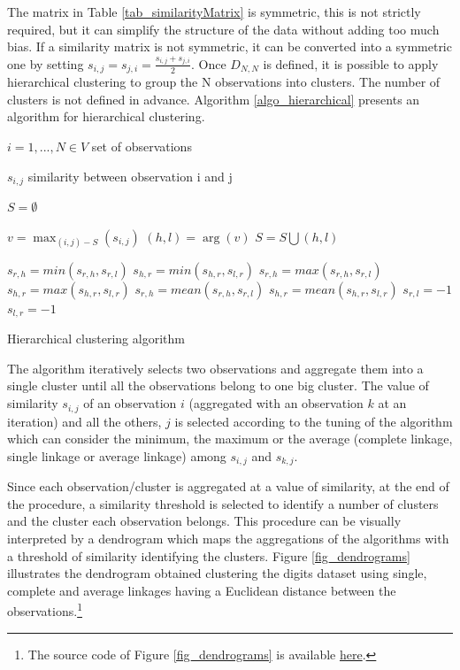 The matrix in Table \ref{tab_similarityMatrix} is symmetric, this is not strictly required, but it can simplify the structure of the data without adding too much bias. If a similarity matrix is not symmetric, it can be converted into a symmetric one by setting $s_{i,j}=s_{j,i}=\frac{s_{i,j}+s_{j,i}}{2}$. Once $D_{N,N}$ is defined, it is possible to apply hierarchical clustering to group the N observations into clusters. The number of clusters is not defined in advance. Algorithm \ref{algo_hierarchical} presents an algorithm for hierarchical clustering.

\begin{algorithm}[H]
\DontPrintSemicolon
\SetAlgoLined
    
    $i=1,...,N \in V$ set of observations \;
    
    $s_{i,j}$ similarity between observation i and j \;
    
    $S= \emptyset $ \;
    {
    $v =\max_{(i,j)-S}{(s_{i,j})}$ \;
    $(h,l)=\arg(v)$\;
    $S= S \bigcup (h,l)$ \;
    {
     {
    $s_{r,h}=min(s_{r,h},s_{r,l})$\;
    $s_{h,r}=min(s_{h,r},s_{l,r})$\;
    }
     {
    $s_{r,h}=max(s_{r,h},s_{r,l})$\;
    $s_{h,r}=max(s_{h,r},s_{l,r})$\;
    }
     {
    $s_{r,h}=mean(s_{r,h},s_{r,l})$\;
    $s_{h,r}=mean(s_{h,r},s_{l,r})$\;
    }
    $s_{r,l}=-1$\;
    $s_{l,r}=-1$\;
    
    }
    }
\caption{Hierarchical clustering algorithm}
\label{algo_hierarchical}        
\end{algorithm}

The algorithm iteratively selects two observations and aggregate them into a single cluster until all the observations belong to one big cluster. The value of similarity $s_{i,j}$ of an observation $i$ (aggregated with an observation $k$ at an iteration) and all the others, $j$ is selected according to the tuning of the algorithm which can consider the minimum, the maximum or the average (complete linkage, single linkage or average linkage) among $s_{i,j}$ and $s_{k,j}$.\par

Since each observation/cluster is aggregated at a value of similarity, at the end of the procedure, a similarity threshold is selected to identify a number of clusters and the cluster each observation belongs. This procedure can be visually interpreted by a dendrogram which maps the aggregations of the algorithms with a threshold of similarity identifying the clusters. Figure \ref{fig_dendrograms} illustrates the dendrogram obtained clustering the digits dataset using single, complete and average linkages having a Euclidean distance between the observations.\footnote{The source code of Figure \ref{fig_dendrograms} is available \href{https://github.com/aletuf93/logproj/blob/master/examples/06.\%20Unsupervised\%20learning.ipynb}{here}.}

